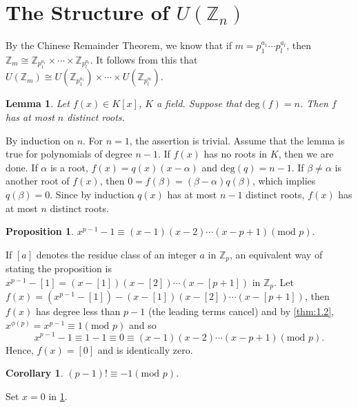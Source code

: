 \documentclass{article}
\makeatletter
\newtheorem{corollary}{Corollary}[section]
\newtheorem{lemma}{Lemma}[section]
\theoremstyle{definition}
\newtheorem{prop}{Proposition}[section]
\theoremstyle{remark}
\let\oldproofname=\proofname
\renewcommand{\proofname}{\textit{\oldproofname}}
\theoremstyle{definition}
\renewenvironment{proof}[1][\proofname]{\par
  \pushQED{\qed}%
  \normalfont \topsep6\p@\@plus6\p@\relax
  \list{}{\leftmargin=0mm
          \rightmargin=0mm
          \settowidth{\itemindent}{\itshape#1}%
          \labelwidth=\itemindent
          \parsep=0pt \listparindent=0mm%
  }
  \item[\hskip\labelsep
        \itshape
    #1\@addpunct{.}]\ignorespaces
}{%
  \popQED\endlist\@endpefalse
}
\makeatother
\begin{document}
\section{The Structure of $U(\mathbb{Z}_n)$}
    By the Chinese Remainder Theorem, we know that if $m=p_1^{a_1}\cdots p_l^{a_l}$, then $\mathbb{Z}_m\cong\mathbb{Z}_{p_1^{a_1}}\times\cdots\times\mathbb{Z}_{p_l^{a_l}}$. It follows from this that $U(\mathbb{Z}_m)\cong U(\mathbb{Z}_{p_1^{a_1}})\times\cdots\times U(\mathbb{Z}_{p_l^{a_l}})$.
    \begin{lemma}\label{lem:3.1}
        Let $f(x)\in K[x]$, $K$ a field. Suppose that $\text{deg}(f)=n$. Then $f$ has at most $n$ distinct roots.    
    \end{lemma}
        \begin{proof}
            By induction on $n$. For $n=1$, the assertion is trivial. Assume that the lemma is true for polynomials of degree $n-1$. If $f(x)$ has no roots in $K$, then we are done. If $\alpha$ is a root, $f(x)=q(x)(x-\alpha)$ and $\text{deg}(q)=n-1$. If $\beta\neq\alpha$ is another root of $f(x)$, then $0=f(\beta)=(\beta-\alpha)q(\beta)$, which implies $q(\beta)=0$. Since by induction $q(x)$ has at most $n-1$ distinct roots, $f(x)$ has at most $n$ distinct roots.
        \end{proof}
    \begin{prop}\label{prop:3.1}
        $x^{p-1}-1\equiv(x-1)(x-2)\cdots(x-p+1)(\text{mod }p)$.
    \end{prop}
        \begin{proof}
            If $[a]$ denotes the residue class of an integer $a$ in $\mathbb{Z}_p$, an equivalent way of stating the proposition is $x^{p-1}-[1]=(x-[1])(x-[2])\cdots(x-[p+1])$ in $\mathbb{Z}_p$. Let $f(x)=(x^{p-1}-[1])-(x-[1])(x-[2])\cdots(x-[p+1])$, then $f(x)$ has degree less than $p-1$ (the leading terms cancel) and by \cref{thm:1.2}, $x^{\phi(p)}=x^{p-1}\equiv 1(\text{mod }p)$ and so 
                \begin{equation*}
                    x^{p-1}-1\equiv 1-1\equiv 0\equiv(x-1)(x-2)\cdots(x-p+1)(\text{mod }p).
                \end{equation*}
            Hence, $f(x)=[0]$ and is identically zero.
        \end{proof}
    \begin{corollary}\label{cor:3.1}
        $(p-1)!\equiv -1(\text{mod }p)$.
    \end{corollary}
        \begin{proof}
            Set $x=0$ in \cref{prop:3.1}.
        \end{proof}
\end{document}
